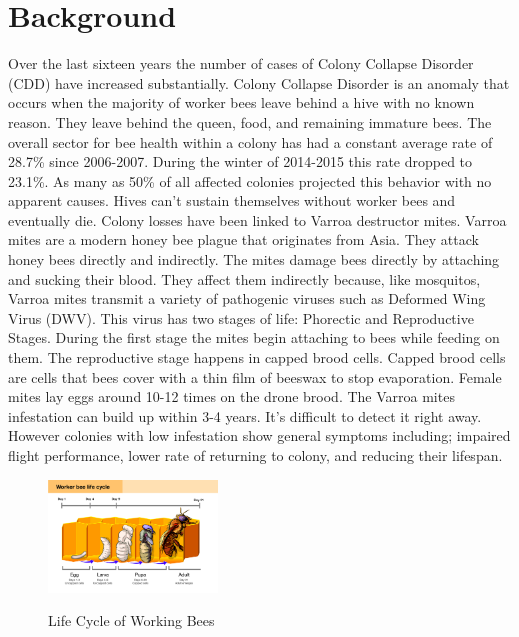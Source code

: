 \documentclass[final,5p,times,twocolumn,authoryear]{elsarticle}
\begin{document}
\section{Background}
\label{Background}

	Over the last sixteen years the number of cases of Colony Collapse Disorder (CDD) have increased substantially. Colony Collapse Disorder is an anomaly that occurs when the majority of worker bees leave behind a hive with no known reason. They leave behind the queen, food, and remaining immature bees. The overall sector for bee health within a colony has had a constant average rate of 28.7\% since 2006-2007. During the winter of 2014-2015 this rate dropped to 23.1\%. As many as 50\% of all affected colonies projected this behavior with no apparent causes. Hives can’t sustain themselves without worker bees and eventually die.  
        Colony losses have been linked to Varroa destructor mites. Varroa mites are a modern honey bee plague that originates from Asia. They attack honey bees directly and indirectly. The mites damage bees directly by attaching and sucking their blood. They affect them indirectly because, like mosquitos, Varroa mites transmit a variety of pathogenic viruses such as Deformed Wing Virus (DWV). This virus has two stages of life: Phorectic and Reproductive Stages. During the first stage the mites begin attaching to bees while feeding on them. The reproductive stage happens in capped brood cells. Capped brood cells are cells that bees cover with a thin film of beeswax to stop evaporation. Female mites lay eggs around 10-12 times on the drone brood. The Varroa mites infestation can build up within 3-4 years. It’s difficult to detect it right away. However colonies with low infestation show general symptoms including; impaired flight performance, lower rate of returning to colony, and reducing their lifespan.

\begin{figure}
  \centering
  \includegraphics[width=0.4\textwidth, angle=360]{beecycle.jpg}
  
  Life Cycle of Working Bees
\end{figure}
        
\end{document}
